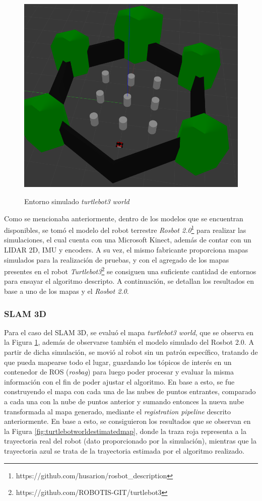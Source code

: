 \begin{figure}[!ht]
    \centering
    {\includegraphics[width=0.9\linewidth]{Img/TurtleBotWorldMap3D.png}}
    \caption{Entorno simulado \textit{turtlebot3 world}}
    \label{fig:turtlebotworldoriginalmap}
\end{figure}
Como se mencionaba anteriormente, dentro de los modelos que se encuentran disponibles, se tomó el modelo del robot terrestre \textit{Rosbot 2.0}\footnote{https://github.com/husarion/rosbot\_description} para realizar las simulaciones, el cual cuenta con una Microsoft Kinect, además de contar con un LIDAR 2D, IMU y encoders. A su vez, el mismo fabricante proporciona mapas simulados para la realización de pruebas, y con el agregado de los mapas presentes en el robot \textit{Turtlebot3}\footnote{https://github.com/ROBOTIS-GIT/turtlebot3} se consiguen una suficiente cantidad de entornos para ensayar el algoritmo descripto. A continuación, se detallan los resultados en base a uno de los mapas y el \textit{Rosbot 2.0}.

\subsubsection{SLAM 3D}
Para el caso del SLAM 3D, se evaluó el mapa \textit{turtlebot3 world}, que se observa en la Figura \ref{fig:turtlebotworldoriginalmap}, además de observarse también el modelo simulado del Rosbot 2.0. A partir de dicha simulación, se movió al robot sin un patrón específico, tratando de que pueda mapearse todo el lugar, guardando los tópicos de interés en un contenedor de ROS (\textit{rosbag}) para luego poder procesar y evaluar la misma información con el fin de poder ajustar el algoritmo. En base a esto, se fue construyendo el mapa con cada una de las nubes de puntos entrantes, comparado a cada una con la nube de puntos anterior y sumando entonces la nueva nube transformada al mapa generado, mediante el \textit{registration pipeline} descrito anteriormente. En base a esto, se consiguieron los resultados que se observan en la Figura \ref{fig:turtlebotworldestimatedmap}, donde la traza roja representa a la trayectoria real del robot (dato proporcionado por la simulación), mientras que la trayectoria azul se trata de la trayectoria estimada por el algoritmo realizado.

